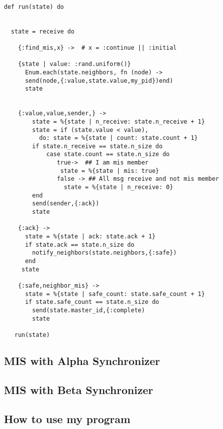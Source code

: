 \begin{lstlisting}[frame=single]

def run(state) do


  state = receive do

    {:find_mis,x} ->  # x = :continue || :initial

    {state | value: :rand.uniform()}
      Enum.each(state.neighbors, fn (node) ->
      send(node,{:value,state.value,my_pid})end)
      state


    {:value,value,sender,} ->
        state = %{state | n_receive: state.n_receive + 1}
        state = if (state.value < value),
          do: state = %{state | count: state.count + 1} 
        if state.n_receive == state.n_size do
            case state.count == state.n_size do
               true->  ## I am mis member
                state = %{state | mis: true}
               false -> ## All msg receive and not mis member
                 state = %{state | n_receive: 0}
        end
        send(sender,{:ack})
        state

    {:ack} ->
      state = %{state | ack: state.ack + 1}
      if state.ack == state.n_size do
        notify_neighbors(state.neighbors,{:safe})
      end
     state

    {:safe,neighbor_mis} ->
      state = %{state | safe_count: state.safe_count + 1}
      if state.safe_count == state.n_size do
        send(state.master_id,{:complete)
        state
    
   run(state)

\end{lstlisting}

\subsection{MIS with Alpha Synchronizer}

\subsection{MIS with Beta Synchronizer}

\subsection{How to use my program}

